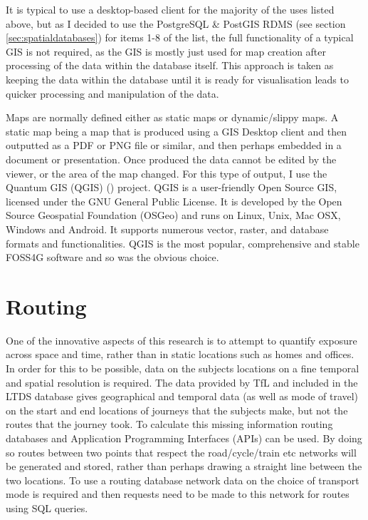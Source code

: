 It is typical to use a desktop-based client for the majority of the uses listed above, but as I decided to use the PostgreSQL \& PostGIS RDMS (see section \ref{sec:spatialdatabases}) for items 1-8 of the list, the full functionality of a typical GIS is not required, as the GIS is mostly just used for map creation after processing of the data within the database itself. This approach is taken as keeping the data within the database until it is ready for visualisation leads to quicker processing and manipulation of the data.

Maps are normally defined either as static maps or dynamic/slippy maps. A static map being a map that is produced using a GIS Desktop client and then outputted as a PDF or PNG file or similar, and then perhaps embedded in a document or presentation. Once produced the data cannot be edited by the viewer, or the area of the map changed. For this type of output, I use the Quantum GIS (QGIS) (\cite{qgis2014}) project. QGIS is a user-friendly Open Source GIS, licensed under the GNU General Public License. It is developed by the Open Source Geospatial Foundation (OSGeo) and runs on Linux, Unix, Mac OSX, Windows and Android. It supports numerous vector, raster, and database formats and functionalities. QGIS is the most popular, comprehensive and stable FOSS4G software and so was the obvious choice.


\section{Routing}
\label{sec:routing}

One of the innovative aspects of this research is to attempt to quantify exposure across space and time, rather than in static locations such as homes and offices. In order for this to be possible, data on the subjects locations on a fine temporal and spatial resolution is required. The data provided by TfL and included in the LTDS database gives geographical and temporal data (as well as mode of travel) on the start and end locations of journeys that the subjects make, but not the routes that the journey took. To calculate this missing information routing databases and Application Programming Interfaces (APIs) can be used. By doing so routes between two points that respect the road/cycle/train etc networks will be generated and stored, rather than perhaps drawing a straight line between the two locations. 
To use a routing database network data on the choice of transport mode is required and then requests need to be made to this network for routes using SQL queries. 

